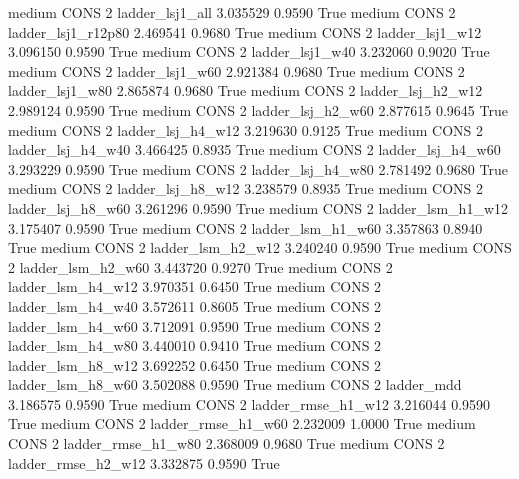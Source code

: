    medium     CONS                 2        ladder_lsj1_all   3.035529      0.9590    True
    medium     CONS                 2     ladder_lsj1_r12p80   2.469541      0.9680    True
    medium     CONS                 2        ladder_lsj1_w12   3.096150      0.9590    True
    medium     CONS                 2        ladder_lsj1_w40   3.232060      0.9020    True
    medium     CONS                 2        ladder_lsj1_w60   2.921384      0.9680    True
    medium     CONS                 2        ladder_lsj1_w80   2.865874      0.9680    True
    medium     CONS                 2      ladder_lsj_h2_w12   2.989124      0.9590    True
    medium     CONS                 2      ladder_lsj_h2_w60   2.877615      0.9645    True
    medium     CONS                 2      ladder_lsj_h4_w12   3.219630      0.9125    True
    medium     CONS                 2      ladder_lsj_h4_w40   3.466425      0.8935    True
    medium     CONS                 2      ladder_lsj_h4_w60   3.293229      0.9590    True
    medium     CONS                 2      ladder_lsj_h4_w80   2.781492      0.9680    True
    medium     CONS                 2      ladder_lsj_h8_w12   3.238579      0.8935    True
    medium     CONS                 2      ladder_lsj_h8_w60   3.261296      0.9590    True
    medium     CONS                 2      ladder_lsm_h1_w12   3.175407      0.9590    True
    medium     CONS                 2      ladder_lsm_h1_w60   3.357863      0.8940    True
    medium     CONS                 2      ladder_lsm_h2_w12   3.240240      0.9590    True
    medium     CONS                 2      ladder_lsm_h2_w60   3.443720      0.9270    True
    medium     CONS                 2      ladder_lsm_h4_w12   3.970351      0.6450    True
    medium     CONS                 2      ladder_lsm_h4_w40   3.572611      0.8605    True
    medium     CONS                 2      ladder_lsm_h4_w60   3.712091      0.9590    True
    medium     CONS                 2      ladder_lsm_h4_w80   3.440010      0.9410    True
    medium     CONS                 2      ladder_lsm_h8_w12   3.692252      0.6450    True
    medium     CONS                 2      ladder_lsm_h8_w60   3.502088      0.9590    True
    medium     CONS                 2             ladder_mdd   3.186575      0.9590    True
    medium     CONS                 2     ladder_rmse_h1_w12   3.216044      0.9590    True
    medium     CONS                 2     ladder_rmse_h1_w60   2.232009      1.0000    True
    medium     CONS                 2     ladder_rmse_h1_w80   2.368009      0.9680    True
    medium     CONS                 2     ladder_rmse_h2_w12   3.332875      0.9590    True
